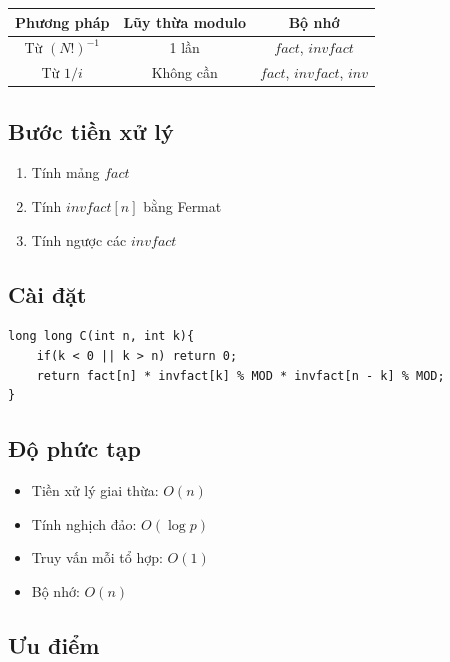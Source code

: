 \begin{center}
\begin{tabular}{|c|c|c|}
\hline
Phương pháp & Lũy thừa modulo & Bộ nhớ \\
\hline
Từ $(N!)^{-1}$ & 1 lần & $fact$, $invfact$ \\
\hline
Từ $1/i$ & Không cần & $fact$, $invfact$, $inv$ \\
\hline
\end{tabular}
\end{center}

\subsection*{Bước tiền xử lý}

\begin{enumerate}
\item Tính mảng $fact$
\item Tính $invfact[n]$ bằng Fermat
\item Tính ngược các $invfact$
\end{enumerate}

\subsection*{Cài đặt}

\begin{tcolorbox}
\begin{verbatim}
long long C(int n, int k){
    if(k < 0 || k > n) return 0;
    return fact[n] * invfact[k] % MOD * invfact[n - k] % MOD;
}
\end{verbatim}
\end{tcolorbox}

\subsection*{Độ phức tạp}

\begin{itemize}
\item Tiền xử lý giai thừa: $O(n)$
\item Tính nghịch đảo: $O(\log p)$
\item Truy vấn mỗi tổ hợp: $O(1)$
\item Bộ nhớ: $O(n)$
\end{itemize}

\subsection*{Ưu điểm}

